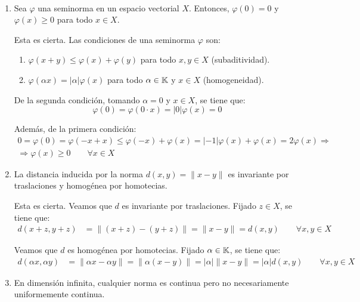 \documentclass[12pt]{article}
\begin{document}
\begin{ejercicio}~
    \begin{enumerate}[label=(\alph*)]
        \item Sea $\varphi$ una seminorma en un espacio vectorial $X$. Entonces, $\varphi(0)=0$ y $\varphi(x)\geq 0$ para todo $x\in X$.
        
        Esta es cierta. Las condiciones de una seminorma $\varphi$ son:
        \begin{enumerate}
            \item $\varphi(x+y) \leq \varphi(x) + \varphi(y)$ para todo $x, y \in X$ (subaditividad).
            \item $\varphi(\alpha x) = |\alpha| \varphi(x)$ para todo $\alpha \in \mathbb{K}$ y $x \in X$ (homogeneidad).
        \end{enumerate}

        De la segunda condición, tomando $\alpha = 0$ y $x \in X$, se tiene que:
        \begin{equation*}
            \varphi(0) = \varphi(0 \cdot x) = |0| \varphi(x) = 0
        \end{equation*}

        Además, de la primera condición:
        \begin{align*}
            0=\varphi(0) = \varphi(-x + x) \leq \varphi(-x) + \varphi(x) = |-1| \varphi(x) + \varphi(x) = 2\varphi(x) \Longrightarrow\\ \Longrightarrow \varphi(x) \geq 0\qquad \forall x \in X
        \end{align*}



        \item La distancia inducida por la norma $d(x,y)=\|x-y\|$ es invariante por traslaciones y homogénea por homotecias.
        
        Esta es cierta. Veamos que $d$ es invariante por traslaciones. Fijado $z \in X$, se tiene que:
        \begin{align*}
            d(x+z, y+z) &= \| (x+z) - (y+z) \| = \| x - y \| = d(x,y)\qquad \forall x, y \in X
        \end{align*}

        Veamos que $d$ es homogénea por homotecias. Fijado $\alpha \in \mathbb{K}$, se tiene que:
        \begin{align*}
            d(\alpha x, \alpha y) &= \| \alpha x - \alpha y \| = \| \alpha (x - y) \| = |\alpha| \| x - y \| = |\alpha| d(x,y)\qquad \forall x, y \in X
        \end{align*}
        \item En dimensión infinita, cualquier norma es continua pero no necesariamente uniformemente continua.
        

\end{enumerate}
\end{ejercicio}
\end{document}
